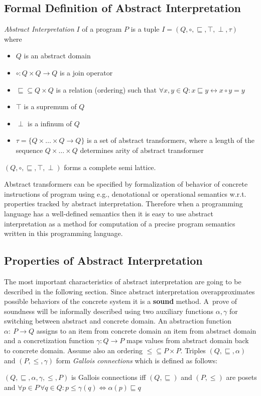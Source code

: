 \documentclass[a4paper, 12pt]{article}
\newcommand{\aord}[0]{\sqsubseteq}
\newcommand{\cord}[0]{\leq}
\newcommand{\adom}[0]{Q}
\newcommand{\aitem}[0]{q}
\newcommand{\asup}[0]{\top}
\newcommand{\ainf}[0]{\perp}
\newcommand{\cdom}[0]{P}
\newcommand{\citem}[0]{p}
\newcommand{\atrans}[0]{\tau}
\newcommand{\ajoin}[0]{\circ}
\newcommand{\afun}[0]{\alpha}
\newcommand{\cfun}[0]{\gamma}
\begin{document}
\subsection{Formal Definition of Abstract Interpretation}
\emph{Abstract Interpretation} $I$ of a program $P$ is a tuple
$I=(\adom, \ajoin, \aord, \asup, \ainf, \atrans)$ where
\begin{itemize}
	\item $\adom$ is an abstract domain
	\item $\ajoin: \adom \times \adom \rightarrow \adom$ is a join operator
	\item $\aord \subseteq \adom \times \adom$ is a relation (ordering) such that $\forall x,y \in \adom: x \aord y \leftrightarrow x \ajoin y = y$
	\item $\asup$ is a supremum of $\adom$
	\item $\ainf$ is a infinum of $\adom$
	\item $\atrans = \{\adom \times \ldots \times \adom \rightarrow \adom\}$ is a set of abstract transformers, where a length of
		the sequence $\adom \times \ldots \times \adom$ determines arity of abstract transformer
\end{itemize}


$(\adom, \ajoin, \aord, \top, \perp)$ forms a complete semi lattice.

Abstract transformers can be specified by formalization of behavior of concrete instructions
of program using e.g., denotational or operational semantics w.r.t. properties tracked
by abstract interpretation.
Therefore when a programming language has a well-defined semantics then
it is easy to use abstract interpretation as a method for computation
of a precise program semantics written in this programming language.

\subsection{Properties of Abstract Interpretation}

The most important characteristics of abstract interpretation
are going to be described in the following section.
Since abstract interpretation overapproximates possible behaviors of
the concrete system it is a \textbf{sound} method.
A~prove of soundness will be informally described using
two auxiliary functions $\afun, \cfun$ for switching between abstract and concrete domain.
An abstraction function $\afun:~\cdom \rightarrow \adom$ assigns to an item from
concrete domain an item from abstract domain and a concretization function
$\cfun: \adom \rightarrow \cdom$ maps values from abstract domain back to concrete domain.
Assume also an ordering $\cord \subseteq \cdom \times \cdom$.
Triples $(\adom, \aord, \afun)$ and $(\cdom, \cord, \cfun)$ form
\emph{Gallois connections} \cite{popl77} which is defined as follows:
\begin{center}
	$(\adom, \aord, \afun, \cfun, \cord, \cdom)$ is Gallois connections iff
	$(\adom, \aord)$ and $(\cdom, \cord)$ are posets and
	$\forall \citem \in \cdom \, \forall \aitem \in \adom: \citem \cord \cfun(\aitem)
	\Leftrightarrow \afun(\citem) \aord \aitem$
\end{center}
\end{document}
